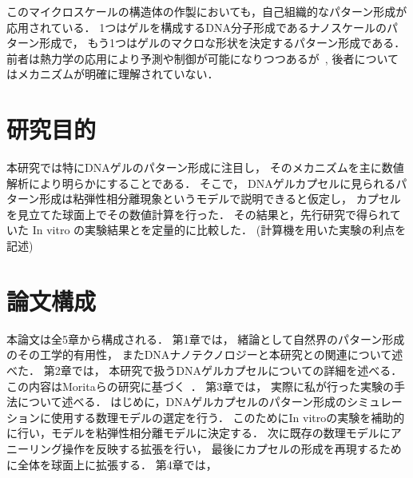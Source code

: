 このマイクロスケールの構造体の作製においても，自己組織的なパターン形成が応用されている．
1つはゲルを構成するDNA分子形成であるナノスケールのパターン形成で，
もう1つはゲルのマクロな形状を決定するパターン形成である．
前者は熱力学の応用により予測や制御が可能になりつつあるが~\cite{zadeh2011nupack}, 
後者についてはメカニズムが明確に理解されていない．


\section{研究目的}
本研究では特にDNAゲルのパターン形成に注目し，
そのメカニズムを主に数値解析により明らかにすることである．
そこで，
DNAゲルカプセルに見られるパターン形成は粘弾性相分離現象というモデルで説明できると仮定し，
カプセルを見立てた球面上でその数値計算を行った．
その結果と，先行研究で得られていた In vitro の実験結果とを定量的に比較した．
(計算機を用いた実験の利点を記述) %

\section{論文構成}
本論文は全5章から構成される．
第1章では，
緒論として自然界のパターン形成のその工学的有用性，
またDNAナノテクノロジーと本研究との関連について述べた．
第2章では，
本研究で扱うDNAゲルカプセルについての詳細を述べる．
この内容はMoritaらの研究に基づく~\cite{morita2017formation}．
第3章では，
実際に私が行った実験の手法について述べる．
はじめに，DNAゲルカプセルのパターン形成のシミュレーションに使用する数理モデルの選定を行う．
このためにIn vitroの実験を補助的に行い，モデルを粘弾性相分離モデルに決定する．
次に既存の数理モデルにアニーリング操作を反映する拡張を行い，
最後にカプセルの形成を再現するために全体を球面上に拡張する．
第4章では，
